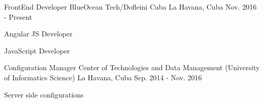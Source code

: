


\begin{cventries}


\cventry
{FrontEnd Developer} %
{BlueOcean Tech/Dofleini Cuba} %
{La Havana, Cuba} %
{Nov. 2016 - Present} %
{ %
\begin{cvitems}
\item {Angular JS Developer}
\item {JavaScript Developer}
\end{cvitems}
}


\cventry
{Configuration Manager} %
{Center of Technologies and Data Management (University of Informatics Science)} %
{La Havana, Cuba} %
{Sep. 2014 - Nov. 2016} %
{ %
\begin{cvitems}
\item {Server side configurations}
\end{cvitems}
}


\end{cventries}

